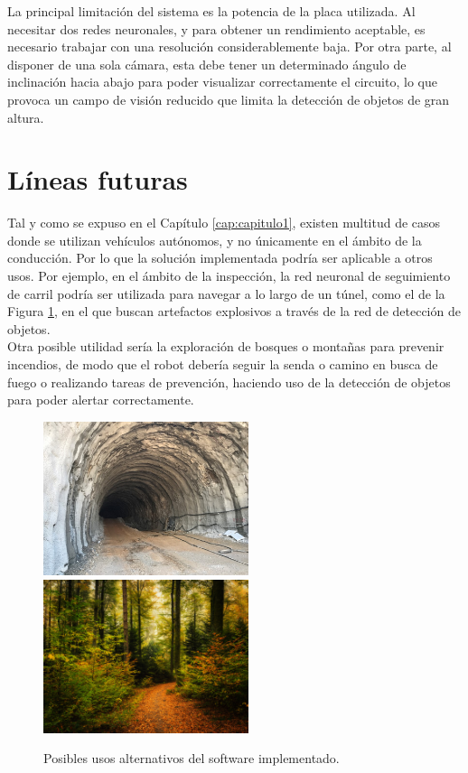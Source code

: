 La principal limitación del sistema es la potencia de la placa utilizada. Al necesitar dos redes neuronales, y para obtener un rendimiento aceptable, es necesario trabajar con una resolución considerablemente baja. Por otra parte, al disponer de una sola cámara, esta debe tener un determinado ángulo de inclinación hacia abajo para poder visualizar correctamente el circuito, lo que provoca un campo de visión reducido que limita la detección de objetos de gran altura.

\section{Líneas futuras}
\label{section:future}
Tal y como se expuso en el Capítulo \ref{cap:capitulo1}, existen multitud de casos donde se utilizan vehículos autónomos, y no únicamente en el ámbito de la conducción. Por lo que la solución implementada podría ser aplicable a otros usos. Por ejemplo, en el ámbito de la inspección, la red neuronal de seguimiento de carril podría ser utilizada para navegar a lo largo de un túnel, como el de la Figura \ref{fig:moreusages}, en el que buscan artefactos explosivos a través de la red de detección de objetos.\\

Otra posible utilidad sería la exploración de bosques o montañas para prevenir incendios, de modo que el robot debería seguir la senda o camino en busca de fuego o realizando tareas de prevención, haciendo uso de la detección de objetos para poder alertar correctamente.

\begin{figure} [h!]
	\begin{center}
		\includegraphics[width=6cm]{figs/tunel}\hspace{0.5cm}\includegraphics[width=6cm]{figs/forest}
	\end{center}
	\caption{Posibles usos alternativos del software implementado.}
	\label{fig:moreusages}
\end{figure}\

